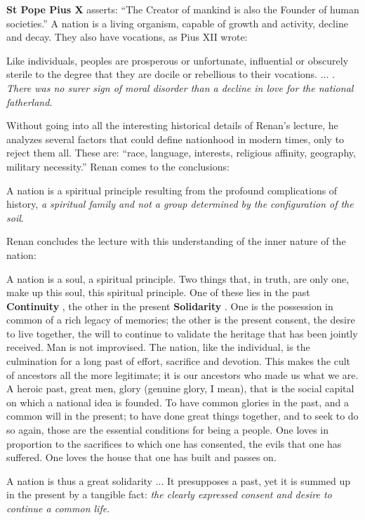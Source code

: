 \textbf{St Pope Pius X} asserts: ``The Creator of mankind is also the Founder of human societies.'' A nation is a living organism, capable of growth and activity, decline and decay. They also have vocations, as Pius XII wrote:

\begin{quotex}
Like individuals, peoples are prosperous or unfortunate, influential or obscurely sterile to the degree that they are docile or rebellious to their vocations. ... . \emph{There was no surer sign of moral disorder than a decline in love for the national fatherland}.
\end{quotex}


Without going into all the interesting historical details of Renan's lecture, he analyzes several factors that could define nationhood in modern times, only to reject them all. These are: ``race, language, interests, religious affinity, geography, military necessity.'' Renan comes to the conclusions:

\begin{quotex}
A nation is a spiritual principle resulting from the profound complications of history, \emph{a spiritual family and not a group determined by the configuration of the soil}.
\end{quotex}


Renan concludes the lecture with this understanding of the inner nature of the nation:

\begin{quotationx}
A nation is a soul, a spiritual principle. Two things that, in truth, are only one, make up this soul, this spiritual principle. One of these lies in the past \textbf{Continuity} , the other in the present \textbf{Solidarity} . One is the possession in common of a rich legacy of memories; the other is the present consent, the desire to live together, the will to continue to validate the heritage that has been jointly received. Man is not improvised. The nation, like the individual, is the culmination for a long past of effort, sacrifice and devotion. This makes the cult of ancestors all the more legitimate; it is our ancestors who made us what we are. A heroic past, great men, glory (genuine glory, I mean), that is the social capital on which a national idea is founded. To have common glories in the past, and a common will in the present; to have done great things together, and to seek to do so again, those are the essential conditions for being a people. One loves in proportion to the sacrifices to which one has consented, the evils that one has suffered. One loves the house that one has built and passes on.

A nation is thus a great solidarity ... It presupposes a past, yet it is summed up in the present by a tangible fact: \emph{the clearly expressed consent and desire to continue a common life}.
\end{quotationx}





